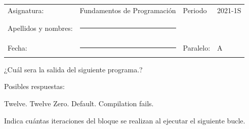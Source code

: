 \documentclass[12pt,answers]{exam}
\begin{document}
\begin{table}[H]
  \centering
  \begin{tabular}[H]{llll}
    Asignatura: & Fundamentos de Programación & Periodo & 2021-1S\\
              &                     &            & \\     
    Apellidos y nombres: &\rule{7cm}{0.4pt}    &  & \\
              &                     &            & \\
    Fecha: &\rule{5cm}{0.4pt}   & Paralelo: & {\Large A} \\
  \end{tabular}
\end{table}




\begin{questions}

\question[25] ¿Cuál sera la salida del siguiente programa.?



 

Posibles respuestas:\\

\begin{checkboxes}
\choice   Twelve.
\choice   Twelve Zero.
\choice   Default.
\CorrectChoice   Compilation fails.
\end{checkboxes}
    
  
  
\newpage
\question[25] Indica cuántas iteraciones del bloque se realizan al ejecutar el siguiente bucle.


 



\end{questions}
\end{document}
